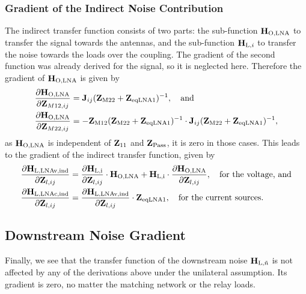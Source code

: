 \subsubsection{Gradient of the Indirect Noise Contribution}
The indirect transfer function consists of two parts: the sub-function $\mathbf{H}_\text{O,LNA}$ to transfer the signal towards the antennas, and the sub-function $\mathbf{H}_{\text{L},i}$ to transfer the noise towards the loads over the coupling.
The gradient of the second function was already derived for the signal, so it is neglected here.
Therefore the gradient of $\mathbf{H}_\text{O,LNA}$ is given by
\begin{align}\label{eq:lnavind_grad12}
\frac{\partial\mathbf{H}_\text{O,LNA}}{\partial\mathbf{Z}_{M12,ij}} &= 
	\mathbf{J}_{ij}(\mathbf{Z}_\text{M22}+\mathbf{Z}_{\text{eqLNA1}})^{-1},\quad\text{and}\\\label{eq:lnavind_grad22}
\frac{\partial\mathbf{H}_\text{O,LNA}}{\partial\mathbf{Z}_{M22,ij}} &= -
	\mathbf{Z}_\text{M12}(\mathbf{Z}_\text{M22}+\mathbf{Z}_{\text{eqLNA1}})^{-1}\cdot
	\mathbf{J}_{ij}(\mathbf{Z}_\text{M22}+\mathbf{Z}_{\text{eqLNA1}})^{-1},
\end{align}
as $\mathbf{H}_\text{O,LNA}$ is independent of $\mathbf{Z}_{11}$ and $\mathbf{Z}_\text{Pass}$, it is zero in those cases.
This leads to the gradient of the indirect transfer function, given by
\begin{align}\label{eq:lnaind_grad}
\frac{\partial\mathbf{H}_\text{L,LNAv,ind}}{\partial\mathbf{Z}_{l,ij}} &= 
	\frac{\partial\mathbf{H}_\text{L,i}}{\partial\mathbf{Z}_{l,ij}}\cdot\mathbf{H}_\text{O,LNA}+
	\mathbf{H}_\text{L,i}\cdot\frac{\partial\mathbf{H}_\text{O,LNA}}{\partial\mathbf{Z}_{l,ij}},
	\quad\text{for the voltage, and}\\
\frac{\partial\mathbf{H}_\text{L,LNAc,ind}}{\partial\mathbf{Z}_{l,ij}} &= 
	\frac{\partial\mathbf{H}_\text{L,LNAv,ind}}{\partial\mathbf{Z}_{l,ij}}\cdot\mathbf{Z}_{\text{eqLNA1}},
	\quad\text{for the current sources}.
\end{align}

\subsection{Downstream Noise Gradient}
\label{sec:down_noise_grad}
Finally, we see that the transfer function of the downstream noise $\mathbf{H}_{\text{L},\tilde{n}}$ is not affected by any of the derivations above under the unilateral assumption.
Its gradient is zero, no matter the matching network or the relay loads.


